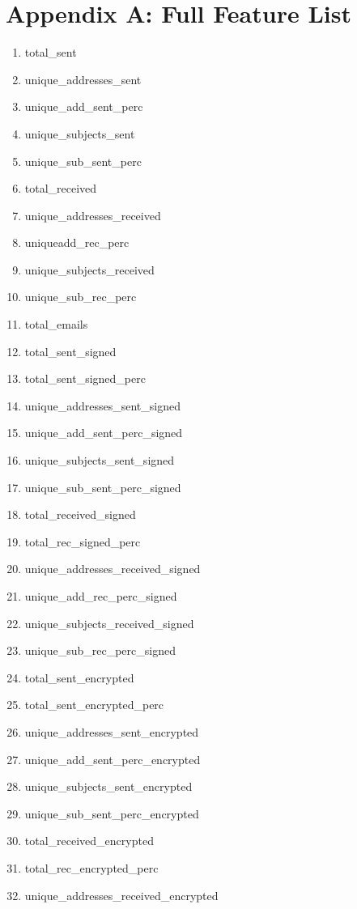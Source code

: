 \documentclass[12pt]{report}
\begin{document}
\chapter*{Appendix A: Full Feature List}
\begin{enumerate}
	\setlength\itemsep{-0.75em}
	\item total\_sent
	\item unique\_addresses\_sent
	\item unique\_add\_sent\_perc
	\item unique\_subjects\_sent
	\item unique\_sub\_sent\_perc
	\item total\_received
	\item unique\_addresses\_received
	\item uniqueadd\_rec\_perc
	\item unique\_subjects\_received
	\item unique\_sub\_rec\_perc
	\item total\_emails
	\item total\_sent\_signed
	\item total\_sent\_signed\_perc
	\item unique\_addresses\_sent\_signed
	\item unique\_add\_sent\_perc\_signed
	\item unique\_subjects\_sent\_signed
	\item unique\_sub\_sent\_perc\_signed
	\item total\_received\_signed
	\item total\_rec\_signed\_perc
	\item unique\_addresses\_received\_signed
	\item unique\_add\_rec\_perc\_signed
	\item unique\_subjects\_received\_signed
	\item unique\_sub\_rec\_perc\_signed
	\item total\_sent\_encrypted
	\item total\_sent\_encrypted\_perc
	\item unique\_addresses\_sent\_encrypted
	\item unique\_add\_sent\_perc\_encrypted
	\item unique\_subjects\_sent\_encrypted
	\item unique\_sub\_sent\_perc\_encrypted
	\item total\_received\_encrypted
	\item total\_rec\_encrypted\_perc
	\item unique\_addresses\_received\_encrypted

\end{enumerate}
\end{document}
